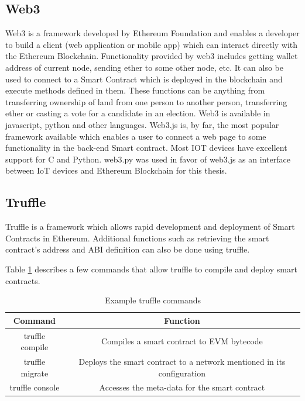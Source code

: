 \documentclass[11pt,openright]{report}
\begin{document}
\subsection{Web3}
Web3 is a framework developed by Ethereum Foundation and enables a developer to build a client (web application or mobile app) which can interact directly with the Ethereum Blockchain. Functionality provided by web3 includes getting wallet address of current node, sending ether to some other node, etc. It can also be used to connect to a Smart Contract which is deployed in the blockchain and execute methods defined in them. These functions can be anything from transferring ownership of land from one person to another person, transferring ether or casting a vote for a candidate in an election. Web3 is available in javascript, python and other languages. Web3.js is, by far, the most popular framework available which enables a user to connect a web page to some functionality in the back-end Smart contract. Most IOT devices have excellent support for C and Python. web3.py was used in favor of web3.js as an interface between IoT devices and Ethereum Blockchain for this thesis.

\subsection{Truffle}
Truffle is a framework which allows rapid development and deployment of Smart Contracts in Ethereum. Additional functions such as retrieving the smart contract's address and ABI definition can also be done using truffle.

Table \ref{truffle_commands} describes a few commands that allow truffle to compile and deploy smart contracts.

\begin{table}[!htbp]
    \renewcommand{\arraystretch}{1.3}
    \caption{Example truffle commands}
    \label{truffle_commands}
    \centering
    \begin{tabular}{|c|c|}
        \hline
        \bfseries Command & \bfseries Function \\
        \hline\hline
        truffle compile & Compiles a smart contract to EVM bytecode \\ \hline
        truffle migrate & Deploys the smart contract to a network mentioned in its configuration \\ \hline
        truffle console & Accesses the meta-data for the smart contract \\ \hline
    \end{tabular}
\end{table}
\end{document}

